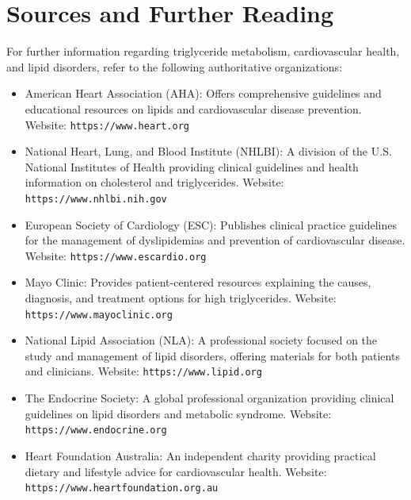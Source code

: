 \section*{Sources and Further Reading}
For further information regarding triglyceride metabolism, cardiovascular health, and lipid disorders, refer to the following authoritative organizations:
\begin{itemize}
    \item American Heart Association (AHA): Offers comprehensive guidelines and educational resources on lipids and cardiovascular disease prevention. Website: \texttt{https://www.heart.org}
    \item National Heart, Lung, and Blood Institute (NHLBI): A division of the U.S. National Institutes of Health providing clinical guidelines and health information on cholesterol and triglycerides. Website: \texttt{https://www.nhlbi.nih.gov}
    \item European Society of Cardiology (ESC): Publishes clinical practice guidelines for the management of dyslipidemias and prevention of cardiovascular disease. Website: \texttt{https://www.escardio.org}
    \item Mayo Clinic: Provides patient-centered resources explaining the causes, diagnosis, and treatment options for high triglycerides. Website: \texttt{https://www.mayoclinic.org}
    \item National Lipid Association (NLA): A professional society focused on the study and management of lipid disorders, offering materials for both patients and clinicians. Website: \texttt{https://www.lipid.org}
    \item The Endocrine Society: A global professional organization providing clinical guidelines on lipid disorders and metabolic syndrome. Website: \texttt{https://www.endocrine.org}
    \item Heart Foundation Australia: An independent charity providing practical dietary and lifestyle advice for cardiovascular health. Website: \texttt{https://www.heartfoundation.org.au}
\end{itemize}